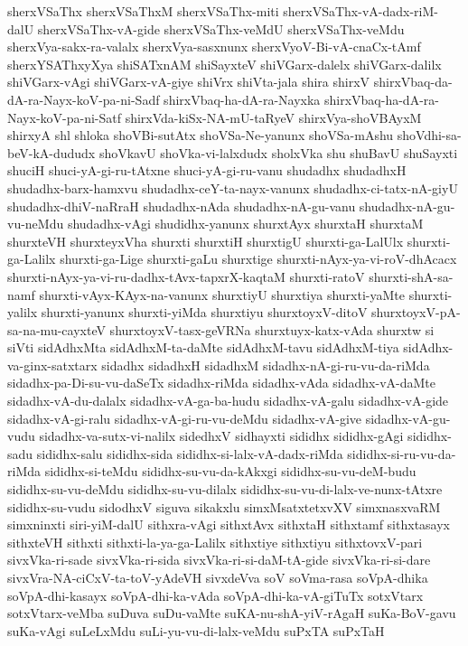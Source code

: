 {sherxVSaThx
sherxVSaThxM
sherxVSaThx-miti
sherxVSaThx-vA-dadx-riM-dalU
sherxVSaThx-vA-gide
sherxVSaThx-veMdU
sherxVSaThx-veMdu
sherxVya-sakx-ra-valalx
sherxVya-sasxnunx
sherxVyoV-Bi-vA-cnaCx-tAmf
sherxYSAThxyXya
shiSATxnAM
shiSayxteV
shiVGarx-dalelx
shiVGarx-dalilx
shiVGarx-vAgi
shiVGarx-vA-giye
shiVrx
shiVta-jala
shira
shirxV
shirxVbaq-da-dA-ra-Nayx-koV-pa-ni-Sadf
shirxVbaq-ha-dA-ra-Nayxka
shirxVbaq-ha-dA-ra-Nayx-koV-pa-ni-Satf
shirxVda-kiSx-NA-mU-taRyeV
shirxVya-shoVBAyxM
shirxyA
shl
shloka
shoVBi-sutAtx
shoVSa-Ne-yanunx
shoVSa-mAshu
shoVdhi-sa-beV-kA-dududx
shoVkavU
shoVka-vi-lalxdudx
sholxVka
shu
shuBavU
shuSayxti
shuciH
shuci-yA-gi-ru-tAtxne
shuci-yA-gi-ru-vanu
shudadhx
shudadhxH
shudadhx-barx-hamxvu
shudadhx-ceY-ta-nayx-vanunx
shudadhx-ci-tatx-nA-giyU
shudadhx-dhiV-naRraH
shudadhx-nAda
shudadhx-nA-gu-vanu
shudadhx-nA-gu-vu-neMdu
shudadhx-vAgi
shudidhx-yanunx
shurxtAyx
shurxtaH
shurxtaM
shurxteVH
shurxteyxVha
shurxti
shurxtiH
shurxtigU
shurxti-ga-LalUlx
shurxti-ga-Lalilx
shurxti-ga-Lige
shurxti-gaLu
shurxtige
shurxti-nAyx-ya-vi-roV-dhAcacx
shurxti-nAyx-ya-vi-ru-dadhx-tAvx-tapxrX-kaqtaM
shurxti-ratoV
shurxti-shA-sa-namf
shurxti-vAyx-KAyx-na-vanunx
shurxtiyU
shurxtiya
shurxti-yaMte
shurxti-yalilx
shurxti-yanunx
shurxti-yiMda
shurxtiyu
shurxtoyxV-ditoV
shurxtoyxV-pA-sa-na-mu-cayxteV
shurxtoyxV-tasx-geVRNa
shurxtuyx-katx-vAda
shurxtw
si
siVti
sidAdhxMta
sidAdhxM-ta-daMte
sidAdhxM-tavu
sidAdhxM-tiya
sidAdhx-va-ginx-satxtarx
sidadhx
sidadhxH
sidadhxM
sidadhx-nA-gi-ru-vu-da-riMda
sidadhx-pa-Di-su-vu-daSeTx
sidadhx-riMda
sidadhx-vAda
sidadhx-vA-daMte
sidadhx-vA-du-dalalx
sidadhx-vA-ga-ba-hudu
sidadhx-vA-galu
sidadhx-vA-gide
sidadhx-vA-gi-ralu
sidadhx-vA-gi-ru-vu-deMdu
sidadhx-vA-give
sidadhx-vA-gu-vudu
sidadhx-va-sutx-vi-nalilx
sidedhxV
sidhayxti
sididhx
sididhx-gAgi
sididhx-sadu
sididhx-salu
sididhx-sida
sididhx-si-lalx-vA-dadx-riMda
sididhx-si-ru-vu-da-riMda
sididhx-si-teMdu
sididhx-su-vu-da-kAkxgi
sididhx-su-vu-deM-budu
sididhx-su-vu-deMdu
sididhx-su-vu-dilalx
sididhx-su-vu-di-lalx-ve-nunx-tAtxre
sididhx-su-vudu
sidodhxV
siguva
sikakxlu
simxMsatxtetxvXV
simxnasxvaRM
simxninxti
siri-yiM-dalU
sithxra-vAgi
sithxtAvx
sithxtaH
sithxtamf
sithxtasayx
sithxteVH
sithxti
sithxti-la-ya-ga-Lalilx
sithxtiye
sithxtiyu
sithxtovxV-pari
sivxVka-ri-sade
sivxVka-ri-sida
sivxVka-ri-si-daM-tA-gide
sivxVka-ri-si-dare
sivxVra-NA-ciCxV-ta-toV-yAdeVH
sivxdeVva
soV
soVma-rasa
soVpA-dhika
soVpA-dhi-kasayx
soVpA-dhi-ka-vAda
soVpA-dhi-ka-vA-giTuTx
sotxVtarx
sotxVtarx-veMba
suDuva
suDu-vaMte
suKA-nu-shA-yiV-rAgaH
suKa-BoV-gavu
suKa-vAgi
suLeLxMdu
suLi-yu-vu-di-lalx-veMdu
suPxTA
suPxTaH
}
